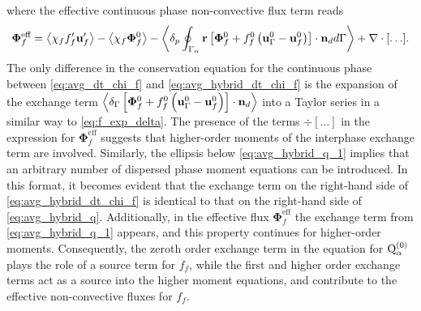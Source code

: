 where the effective continuous phase non-convective flux term reads 
\begin{align}
    \mathbf{\Phi}_f^\text{eff}
    = \avg{\chi_f f_f' \textbf{u}_f'}
    - \avg{\chi_f \bm\Phi_f^0}
    - \pSavg{\textbf{r}\left[
        \mathbf{\Phi}_f^0
        + f_f^0
        \left(
            \textbf{u}_\Gamma^0
            - \textbf{u}_f^0
        \right)
    \right]
    \cdot \textbf{n}_d}
    + \div[\ldots].
    \label{eq:effective_stress}
\end{align}
The only difference in the conservation equation for the continuous phase between \eqref{eq:avg_dt_chi_f} and \eqref{eq:avg_hybrid_dt_chi_f} is the expansion of the exchange term $\left<\delta_\Gamma \left[
    \mathbf{\Phi}_f^0
    + f_f^0
    \left(
        \textbf{u}_\Gamma ^0
        - \textbf{u}_f^0
    \right)
\right]
\cdot \textbf{n}_d\right>$
 into a Taylor series in a similar way to \ref{eq:f_exp_delta}. 
The presence of the terms $\div[\ldots]$ in the expression for  $\mathbf{\Phi}_f^\text{eff}$ suggests that higher-order moments of the interphase exchange term are involved.
Similarly, the ellipsis below \ref{eq:avg_hybrid_q_1} implies that an arbitrary number of dispersed phase moment equations can be introduced. In this format, it becomes evident that the exchange term on the right-hand side of \ref{eq:avg_hybrid_dt_chi_f} is identical to that on the right-hand side of \ref{eq:avg_hybrid_q}. 
Additionally, in the effective flux $\mathbf{\Phi}_f^\text{eff}$ the exchange term from  \ref{eq:avg_hybrid_q_1} appears, and this property continues for higher-order moments.  
Consequently, the zeroth order exchange term in the equation for $\text Q_\alpha^{(0)}$ plays the role of a source term for $f_f$, while the first and higher order exchange terms act as a source into the higher moment equations, and contribute to the effective non-convective fluxes for $f_f$. 


